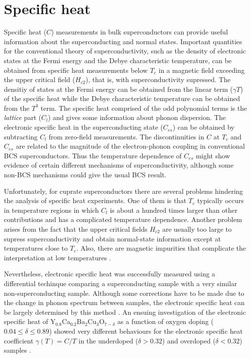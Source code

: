 \section{Specific heat}
\label{sec:specific_heat}

Specific heat ($C$) measurements in bulk superconductors can provide useful information about the superconducting and normal states.
Important quantities for the conventional theory of superconductivity, such as the density of electronic states at the Fermi energy and the Debye characteristic temperature, can be obtained from specific heat measurements below $T_c$ in a magnetic field exceeding the upper critical field ($H_{c2}$), that is, with superconductivity supressed.
The densitiy of states at the Fermi energy can be obtained from the linear term ($\gamma T$) of the specific heat while the Debye characteristic temperature can be obtained from the $T^3$ term.
The specific heat comprised of the odd polynomial terms is the \textit{lattice} part ($C_l$) and gives some information about phonon dispersion. 
The electronic specific heat in the superconducting state  ($C_{es}$) can be obtained by subtracting $C_l$ from zero-field measurements.
The discontinuities in $C$ at $T_c$ and $C_{es}$ are related to the magnitude of the electron-phonon coupling in conventional BCS superconductors.
Thus the temperature dependence of $C_{es}$ might show evidence of certain different mechanisms of superconductivity, although some non-BCS mechanisms could give the usual BCS result.

Unfortunately, for cuprate superconductors there are several problems hindering the analysis of specific heat experiments.
One of them is that $T_c$ typically occurs in temperature regions in which $C_l$ is about a hundred times larger than other contributions and has a complicated temperature dependence.
Another problem arises from the fact that the upper critical fields $H_{c2}$ are usually too large to supress superconductivity and obtain normal-state information except at temperatures close to $T_c$.
Also, there are magnetic impurities that complicate the interpretation at low temperatures \cite{Fisher1988}.

Nevertheless, electronic specific heat was successfully measured using a differential techinque comparing a superconducting sample with a very similar non-superconducting sample. 
Although some corrections have to be made due to the change in phonon spectrum between samples, the electronic specific heat can be largely determined by this method \cite{Loram1990,Loram1993, Loram1994}.
An ensuing investigation of the electronic specific heat of Y$_{0.8}$Ca$_{0.2}$Ba$_2$Cu$_3$O$_{7-\delta}$ as a function of oxygen doping ($0.04\leq \delta \leq 0.89$) showed very different behaviours for the electronic specific heat coefficient $\gamma (T) = C/T$ in the underdoped ($\delta > 0.32$) and overdoped ($\delta < 0.32$) samples \cite{Loram1997}.

